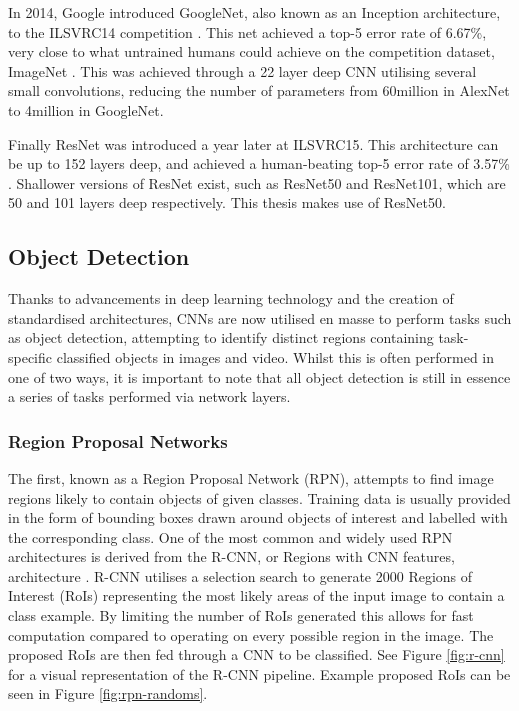  In 2014, Google introduced GoogleNet, also known as an Inception architecture, to the ILSVRC14 competition \cite{szegedy_going_2015}. This net achieved a top-5 error rate of 6.67\%, very close to what untrained humans could achieve on the competition dataset, ImageNet \cite{krizhevsky_imagenet_2012}. This was achieved through a 22 layer deep CNN utilising several small convolutions, reducing the number of parameters from 60million in AlexNet to 4million in GoogleNet. 

Finally ResNet was introduced a year later at ILSVRC15. This architecture can be up to 152 layers deep, and achieved a human-beating top-5 error rate of 3.57\% \cite{he_deep_2015}. Shallower versions of ResNet exist, such as ResNet50 and ResNet101, which are 50 and 101 layers deep respectively. This thesis makes use of ResNet50.

\subsection{Object Detection}\label{ch:Background,sec:objectDetection}

Thanks to advancements in deep learning technology and the creation of standardised architectures, CNNs are now utilised en masse to perform tasks such as object detection, attempting to identify distinct regions containing task-specific classified objects in images and video. Whilst this is often performed in one of two ways, it is important to note that all object detection is still in essence a series of tasks performed via network layers. 

\subsubsection{Region Proposal Networks}\label{ch:Background,sec:objectDetection,sub:RPN}

The first, known as a Region Proposal Network (RPN), attempts to find image regions likely to contain objects of given classes. Training data is usually provided in the form of bounding boxes drawn around objects of interest and labelled with the corresponding class. One of the most common and widely used RPN architectures is derived from the R-CNN, or Regions with CNN features, architecture \cite{girshick_rich_2014}. R-CNN utilises a selection search \cite{uijlings_selective_2013} to generate 2000 Regions of Interest (RoIs) representing the most likely areas of the input image to contain a class example. By limiting the number of RoIs generated this allows for fast computation compared to operating on every possible region in the image. The proposed RoIs are then fed through a CNN to be classified. See Figure \ref{fig:r-cnn} for a visual representation of the R-CNN pipeline. Example proposed RoIs can be seen in Figure \ref{fig:rpn-randoms}.

